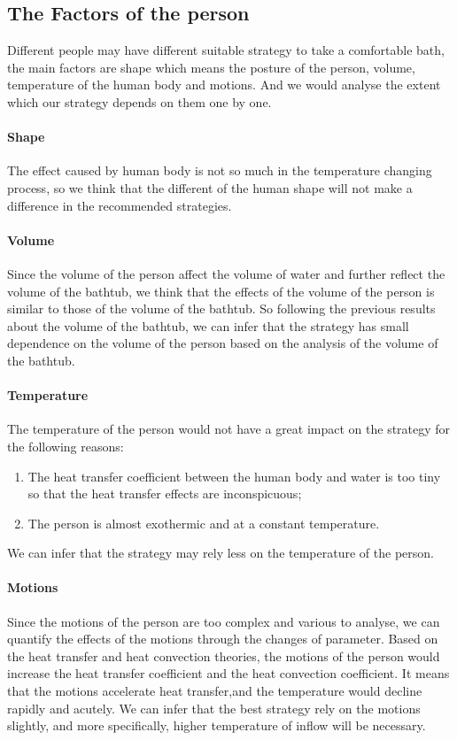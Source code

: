 \documentclass{HZNUMCM}
\begin{document}
\subsection{The Factors of the person}
Different people may have different suitable strategy to take a comfortable bath, the main factors
are shape which means the posture of the person, volume, temperature of the human body and motions.
And we would analyse the extent which our strategy depends on them one by one.

\paragraph{Shape}The effect caused by human body is not so much in the temperature changing process,
so we think that the different of the human shape will not make a difference in the recommended
strategies.

\paragraph{Volume}Since the volume of the person affect the volume of water and further reflect the
volume of the bathtub, we think that the effects of the volume of the person is similar to those of
the volume of the bathtub. So following the previous results about the volume of the bathtub, we can
infer that the strategy has small dependence on the volume of the person based on the analysis of
the volume of the bathtub.

\paragraph{Temperature}The temperature of the person would not have a great impact on the strategy
for the following reasons:
\begin{enumerate}[\bf 1.]
    \item The heat transfer coefficient between the human body and water is too tiny so that the
    heat transfer effects are inconspicuous;
    \item The person is almost exothermic and at a constant temperature.
\end{enumerate}
We can infer that the strategy may rely less on the temperature of the person.

\paragraph{Motions}Since the motions of the person are too complex and various to analyse, we can
quantify the effects of the motions through the changes of parameter. Based on the heat transfer and
heat convection theories, the motions of the person would increase the heat transfer coefficient and
the heat convection coefficient. It means that the motions accelerate heat transfer,and the
temperature would decline rapidly and acutely. We can infer that the best strategy rely on the
motions slightly, and more specifically, higher temperature of inflow will be necessary.
\end{document}
